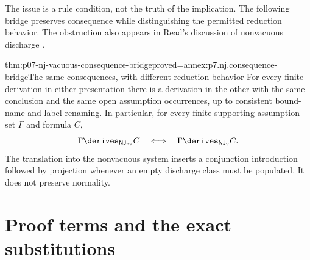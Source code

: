 The issue is a rule condition, not the truth of the implication.
The following bridge preserves consequence while distinguishing
the permitted reduction behavior. The obstruction also appears in
Read's discussion of nonvacuous discharge
\cite[p.~18]{Read2014ProofTheoreticValidityManuscript}.

\begin{hbtheorem}{thm:p07-nj-vacuous-consequence-bridge}{proved=annex:p7.nj.consequence-bridge}{The same consequences, with different reduction behavior}
For every finite derivation in either presentation there is a
derivation in the other with the same conclusion and the same
open assumption occurrences, up to consistent bound-name and
label renaming. In particular, for every finite supporting
assumption set \(\Gamma\) and formula \(C\),
\[
 \Gamma\derives_{\mathsf{NJ}_{\mathrm{nv}}}C
 \quad\Longleftrightarrow\quad
 \Gamma\derives_{\mathsf{NJ}_{\mathrm v}}C.
\]
The translation into the nonvacuous system inserts a conjunction
introduction followed by projection whenever an empty discharge
class must be populated. It does not preserve normality.
\end{hbtheorem}

\section{Proof terms and the exact substitutions}

